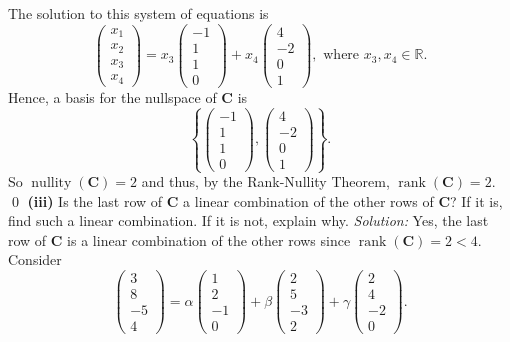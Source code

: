 \documentclass{article}
\begin{document}
The solution to this system of equations is \[\begin{pmatrix}x_1\\x_2\\x_3\\x_4\end{pmatrix}=x_3\begin{pmatrix}-1\\1\\1\\0\end{pmatrix}+x_4\begin{pmatrix}4\\-2\\0\\1\end{pmatrix},\text{ where }x_3,x_4\in\mathbb{R}.\] Hence, a basis for the nullspace of $\mathbf{C}$ is \[\left\{\begin{pmatrix}-1\\1\\1\\0\end{pmatrix},\begin{pmatrix}4\\-2\\0\\1\end{pmatrix}\right\}.\] So $\operatorname{nullity}(\mathbf{C})=2$ and thus, by the Rank-Nullity Theorem, $\operatorname{rank}(\mathbf{C})=2$. \qed
\newline
\newline\textbf{(iii)} Is the last row of $\mathbf{C}$ a linear combination of the other rows of $\mathbf{C}$? If it is, find such a linear combination.
If it is not, explain why.
\newline
\newline\textit{Solution:} Yes, the last row of $\mathbf{C}$ is a linear combination of the other rows since $\operatorname{rank}(\mathbf{C})=2 < 4$. Consider \[\begin{pmatrix}3\\8\\-5\\4\end{pmatrix}=\alpha\begin{pmatrix}1\\2\\-1\\0\end{pmatrix}+\beta\begin{pmatrix}2\\5\\-3\\2\end{pmatrix}+\gamma\begin{pmatrix}2\\4\\-2\\0\end{pmatrix}.\]
\end{document}

